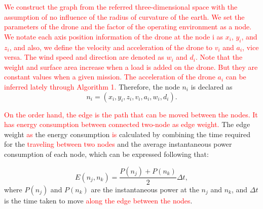 \documentclass[journal]{./template/IEEEtran}
\begin{document}
\textcolor{red}{We construct the graph from the referred three-dimensional space with the assumption of no influence of the radius of curvature of the earth.
We set the parameters of the drone and the factor of the operating environment as a node.
We notate each axis position information of the drone at the node i as $x_i$, $y_i$, and $z_i$, and also, we define the velocity and acceleration of the drone to $v_i$ and $a_i$, vice versa.
The wind speed and direction are denoted as $w_i$ and $d_i$. 
Note that the weight and surface area increase when a load is added on the drone. But they are constant values when a given mission. The acceleration of the drone $a_i$ can be inferred lately through Algorithm 1.}
Therefore, the node $n_i$ is declared as 
\begin{equation*}
n_i = (x_i, y_i, z_i, v_i, a_i, w_i, d_i). \tag{6.1} \label{eq:node}
\end{equation*}


\noindent\textcolor{red}{On the order hand, the edge is the path that can be moved between the nodes. It has energy consumption between connected two-node as edge weight.}
The edge weight \textcolor{red}{as} the energy consumption \textcolor{red}{is} calculated by combining the time required for the \textcolor{red}{traveling between two nodes} and the average instantaneous power consumption of each node, which can be expressed following that: 

\begin{equation*}
E(n_j, n_k) = \frac{P(n_j)+P(n_k)}{2} \Delta t, \tag{6.2} \label{eq:edge}
\end{equation*}
where $P(n_j)$ and $P(n_k)$ are the instantaneous power at the $n_j$ and $n_k$, and $\Delta t$ is the time taken to move \textcolor{red}{along the edge between the nodes}.
\end{document}
